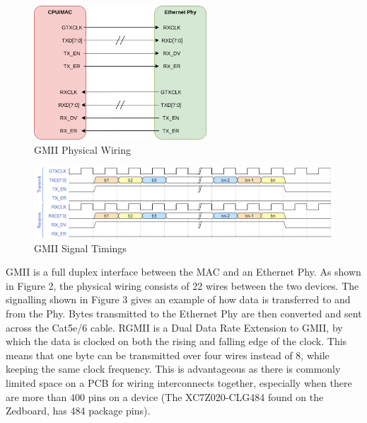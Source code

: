 \begin{figure}[H]
    \begin{center}
        \includegraphics[keepaspectratio,height=5cm]{Images/GMIIWiring}
        \caption{GMII Physical Wiring}
        \label{fig:gmiiwiring}
    \end{center}
\end{figure}

\begin{figure}[H]
    \begin{center}
        \includegraphics[keepaspectratio,width=15cm]{Images/GMIISignaling}
        \caption{GMII Signal Timings}
        \label{fig:gmiisignals}
    \end{center}
\end{figure}

\par GMII is a full duplex interface between the MAC and an Ethernet Phy. As shown in Figure 2, the physical wiring 
consists of 22 wires between the two devices. The signalling shown in Figure 3 gives an example of how data is 
transferred to and from the Phy. Bytes transmitted to the Ethernet Phy are then converted and sent across the 
Cat5e/6 cable. RGMII is a Dual Data Rate Extension to GMII, by which the data is clocked on both the rising and 
falling edge of the clock. This means that one byte can be transmitted over four wires instead of 8, while keeping 
the same clock frequency. This is advantageous as there is commonly limited space on a PCB for wiring interconnects 
together, especially when there are more than 400 pins on a device (The XC7Z020-CLG484 found on the Zedboard, has 
484 package pins). 

